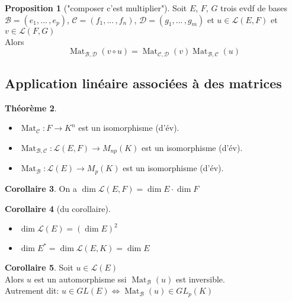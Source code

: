 \documentclass[10pt,a4paper]{article}
\theoremstyle{definition}
\newtheorem{proposition}{Proposition}[section]
\newtheorem{theorem}[proposition]{Théorème}
\newtheorem{corollaire}[proposition]{Corollaire}
\DeclareMathOperator{\Mat}{Mat}
\begin{document}
\begin{proposition}["composer c'est multiplier"]
Soit $E$, $F$, $G$ trois evdf de bases \\
$\mathcal{B} = (e_1, ...\, , e_p)$, $\mathcal{C} = (f_1, ...\, , f_n)$, $\left. \mathcal{D} = (g_1, ...\, , g_m) \right.$ et $u \in \mathcal{L}(E, F)$ et $v \in \mathcal{L}(F, G)$ \\
Alors
\[\Mat_{\mathcal{B}, \mathcal{D}}(v \circ u) = \Mat_{\mathcal{C}, \mathcal{D}}(v) \Mat_{\mathcal{B}, \mathcal{C}}(u)\]
\end{proposition}

\subsection{Application linéaire associées à des matrices}
\begin{theorem}
\hfill
\begin{itemize}
\item $\Mat_\mathcal{C} : F \to K^n$ est un isomorphisme (d'év).
\item $\Mat_{\mathcal{B}, \mathcal{C}} : \mathcal{L}(E, F) \to M_{np}(K)$ est un isomorphisme (d'év).
\item $\Mat_\mathcal{B} : \mathcal{L}(E) \to M_p(K)$ est un isomorphisme (d'év).
\end{itemize}
\end{theorem}
\begin{corollaire}
On a $\dim \mathcal{L}(E, F) =  \dim E \cdot \dim F$
\end{corollaire}
\begin{corollaire}[du corollaire]
\hfill
\begin{itemize}
\item $\dim \mathcal{L}(E) = (\dim E)^2$
\item $\dim E^* = \dim \mathcal{L}(E, K) = \dim E$
\end{itemize}
\end{corollaire}
\begin{corollaire}
Soit $u \in \mathcal{L}(E)$ \\
Alors $u$ est un automorphisme ssi $\Mat_\mathcal{B}(u)$ est inversible. \\
Autrement dit: $u \in GL(E) \iff \Mat_\mathcal{B}(u) \in GL_p(K)$
\end{corollaire}
\end{document}
